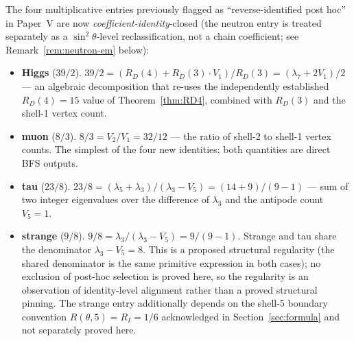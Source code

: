 \documentclass[12pt]{article}
\begin{document}
The four multiplicative entries previously flagged as ``reverse-identified post hoc'' in Paper~V are now \emph{coefficient-identity}-closed (the neutron entry is treated separately as a $\sin^2\theta$-level reclassification, not a chain coefficient; see Remark~\ref{rem:neutron-em} below):

\begin{itemize}
    \item \textbf{Higgs} ($39/2$). $39/2 = (R_D(4) + R_D(3) \cdot V_1)/R_D(3) = (\lambda_7 + 2 V_1)/2$ — an algebraic decomposition that re-uses the independently established $R_D(4) = 15$ value of Theorem~\ref{thm:RD4}, combined with $R_D(3)$ and the shell-1 vertex count.
    \item \textbf{muon} ($8/3$). $8/3 = V_2 / V_1 = 32/12$ — the ratio of shell-2 to shell-1 vertex counts. The simplest of the four new identities; both quantities are direct BFS outputs.
    \item \textbf{tau} ($23/8$). $23/8 = (\lambda_5 + \lambda_3)/(\lambda_3 - V_5) = (14 + 9)/(9 - 1)$ — sum of two integer eigenvalues over the difference of $\lambda_3$ and the antipode count $V_5 = 1$.
    \item \textbf{strange} ($9/8$). $9/8 = \lambda_3 / (\lambda_3 - V_5) = 9/(9 - 1)$. Strange and tau share the denominator $\lambda_3 - V_5 = 8$. This is a proposed structural regularity (the shared denominator is the same primitive expression in both cases); no exclusion of post-hoc selection is proved here, so the regularity is an observation of identity-level alignment rather than a proved structural pinning. The strange entry additionally depends on the shell-5 boundary convention $R(\theta, 5) = R_I = 1/6$ acknowledged in Section~\ref{sec:formula} and not separately proved here.
\end{itemize}
\end{document}
